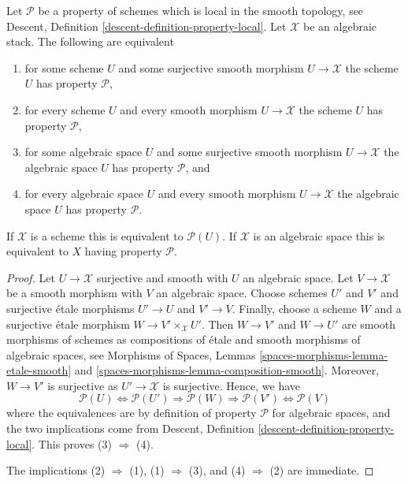 \begin{lemma}
\label{lemma-type-property}
Let $\mathcal{P}$ be a property of schemes which is local in the smooth
topology, see
Descent, Definition \ref{descent-definition-property-local}.
Let $\mathcal{X}$ be an algebraic stack. The following are equivalent
\begin{enumerate}
\item for some scheme $U$ and some surjective smooth morphism
$U \to \mathcal{X}$ the scheme $U$ has property $\mathcal{P}$,
\item for every scheme $U$ and every smooth morphism $U \to \mathcal{X}$
the scheme $U$ has property $\mathcal{P}$,
\item for some algebraic space $U$ and some surjective smooth morphism
$U \to \mathcal{X}$ the algebraic space $U$ has property $\mathcal{P}$, and
\item for every algebraic space $U$ and every smooth morphism
$U \to \mathcal{X}$ the algebraic space $U$ has property $\mathcal{P}$.
\end{enumerate}
If $\mathcal{X}$ is a scheme this is equivalent to $\mathcal{P}(U)$.
If $\mathcal{X}$ is an algebraic space this is equivalent to
$X$ having property $\mathcal{P}$.
\end{lemma}

\begin{proof}
Let $U \to \mathcal{X}$ surjective and smooth with $U$ an algebraic space.
Let $V \to \mathcal{X}$ be a smooth morphism with $V$ an algebraic space.
Choose schemes $U'$ and $V'$ and surjective \'etale morphisms
$U' \to U$ and $V' \to V$. Finally, choose a scheme $W$ and a
surjective \'etale morphism $W \to V' \times_\mathcal{X} U'$.
Then $W \to V'$ and $W \to U'$ are smooth morphisms of schemes
as compositions of \'etale and smooth morphisms of algebraic spaces, see
Morphisms of Spaces, Lemmas \ref{spaces-morphisms-lemma-etale-smooth} and
\ref{spaces-morphisms-lemma-composition-smooth}.
Moreover, $W \to V'$ is surjective as $U' \to \mathcal{X}$ is surjective.
Hence, we have
$$
\mathcal{P}(U) \Leftrightarrow
\mathcal{P}(U') \Rightarrow
\mathcal{P}(W) \Rightarrow
\mathcal{P}(V') \Leftrightarrow \mathcal{P}(V)
$$
where the equivalences are by definition of property $\mathcal{P}$ for
algebraic spaces, and the two implications come from
Descent, Definition \ref{descent-definition-property-local}.
This proves (3) $\Rightarrow$ (4).

\medskip\noindent
The implications (2) $\Rightarrow$ (1), (1) $\Rightarrow$ (3),
and (4) $\Rightarrow$ (2) are immediate.
\end{proof}

